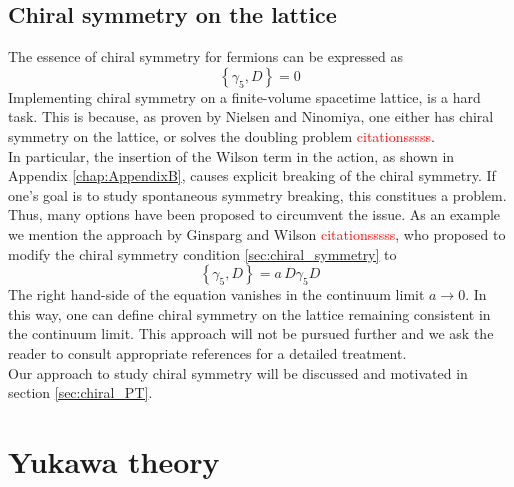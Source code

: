 \subsection{Chiral symmetry on the lattice}
The essence of chiral symmetry for fermions can be expressed as \cite{gattringer_LQCD}
\begin{equation}
    \left\{\gamma_5, D \right\} = 0
    \label{eq:chiral_symmetry}
\end{equation}
Implementing chiral symmetry on a finite-volume spacetime lattice, is a hard task. This is because, as proven by Nielsen and Ninomiya, one either has chiral symmetry on the lattice, or solves the doubling problem \textcolor{red}{citationsssss}. \\
In particular, the insertion of the Wilson term in the action, as shown in Appendix \ref{chap:AppendixB}, causes explicit breaking of the chiral symmetry. If one's goal is to study spontaneous symmetry breaking, this constitues a problem. 
Thus, many options have been proposed to circumvent the issue. As an example we mention the approach by Ginsparg and Wilson \textcolor{red}{citationsssss}, who proposed to modify the chiral symmetry condition \eqref{sec:chiral_symmetry} to 
\begin{equation*}
    \left\{\gamma_5, D \right\} = a \, D \gamma_5 D
\end{equation*}
The right hand-side of the equation vanishes in the continuum limit $a \to 0$. In this way, one can define chiral symmetry on the lattice remaining consistent in the continuum limit. This approach will not be pursued further and we ask the reader to consult 
appropriate references \cite{rothe_LGT,gattringer_LQCD} for a detailed treatment. \\
Our approach to study chiral symmetry will be discussed and motivated in section \ref{sec:chiral_PT}.

\section{Yukawa theory}
\label{sec:Yukawa_theory}

